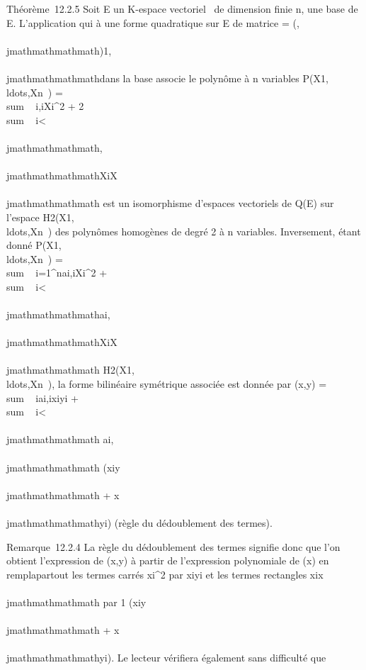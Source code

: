 Théorème~12.2.5 Soit E un K-espace vectoriel ~de dimension finie n, 
une base de E. L'application qui à une forme quadratique \Phi sur E de
matrice \Omega = (\omegai,\\\\jmathmathmathmath)1\leqi,\\\\jmathmathmathmath\leqn dans la base  associe le
polynôme à n variables
P\Phi(X1,\\ldots,Xn~)
= \\sum ~
i\omegai,iXi^2 +
2\\sum ~
i\textless{}\\\\jmathmathmathmath\omegai,\\\\jmathmathmathmathXiX\\\\jmathmathmathmath est un
isomorphisme d'espaces vectoriels de Q(E) sur l'espace
H2(X1,\\ldots,Xn~)
des polynômes homogènes de degré 2 à n variables. Inversement, étant
donné
P(X1,\\ldots,Xn~)
= \\sum ~
i=1^nai,iXi^2
+ \\sum ~
i\textless{}\\\\jmathmathmathmathai,\\\\jmathmathmathmathXiX\\\\jmathmathmathmath \in
H2(X1,\\ldots,Xn~),
la forme bilinéaire symétrique associée est donnée par \phi(x,y)
= \\sum ~
iai,ixiyi
+ \\sum ~
i\textless{}\\\\jmathmathmathmath ai,\\\\jmathmathmathmath {}
(xiy\\\\jmathmathmathmath + x\\\\jmathmathmathmathyi) (règle du
dédoublement des termes).

Remarque~12.2.4 La règle du dédoublement des termes signifie donc que
l'on obtient l'expression de \phi(x,y) à partir de l'expression polynomiale
de \Phi(x) en rempla\ccant partout les termes carrés
xi^2 par xiyi et les termes
rectangles xix\\\\jmathmathmathmath par  1 
(xiy\\\\jmathmathmathmath + x\\\\jmathmathmathmathyi). Le lecteur
vérifiera également sans difficulté que


